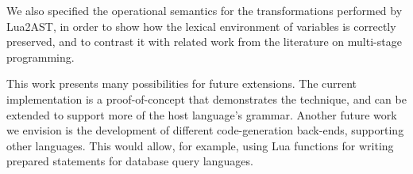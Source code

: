 \documentclass[english]{llncs}
\begin{document}
We also specified the operational semantics for the transformations
performed by Lua2AST, in order to show how the lexical environment
of variables is correctly preserved, and to contrast it with
related work from the literature on multi-stage programming.

This work presents many possibilities for future extensions. The current
implementation is a proof-of-concept that demonstrates the technique,
and can be extended to support more of the host language's grammar. Another future work
we envision is the development of different code-generation back-ends,
supporting other languages. This would allow, for example, using
Lua functions for writing prepared statements for database query
languages.




\end{document}
